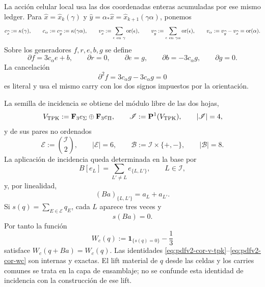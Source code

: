 La acción celular local usa las dos coordenadas enteras acumuladas por ese
mismo ledger. Para
\(\widehat x=\widehat x_k(\gamma)\) y
\(\widehat y=\alpha_*\widehat x=\widehat x_{k+1}(\gamma\alpha)\), ponemos
\begin{equation}
\label{eq:pdfv2-cor-c-v}
 c_{\widehat x}:=\kappa(\gamma),\qquad
 c_\alpha:=c_{\widehat y}:=\kappa(\gamma\alpha),
 \qquad
 v_{\widehat x}:=\sum_{\epsilon\ {\rm en}\ \gamma}
                  \operatorname{or}(\epsilon),\qquad
 v_{\widehat y}:=
 \sum_{\epsilon\ {\rm en}\ \gamma\alpha}
                  \operatorname{or}(\epsilon),\qquad
 v_\alpha:=v_{\widehat y}-v_{\widehat x}
           =\operatorname{or}(\alpha).
\end{equation}
Sobre los generadores \(f,r,e,b,g\) se define
\begin{equation}
\label{eq:pdfv2-cor-complejo-local}
 \partial f=3c_\alpha e+b,\qquad
 \partial r=0,\qquad
 \partial e=g,\qquad
 \partial b=-3c_\alpha g,\qquad
 \partial g=0.
\end{equation}
La cancelación
\begin{equation}
\label{eq:pdfv2-cor-dos-cero}
 \partial^2f=3c_\alpha g-3c_\alpha g=0
\end{equation}
es literal y usa el mismo carry con los dos signos impuestos por la
orientación.

La semilla de incidencia se obtiene del módulo libre de las dos hojas,
\begin{equation}
\label{eq:pdfv2-cor-v-tpk}
 V_{\rm TPK}:=\mathbf F_3e_\Sigma\oplus\mathbf F_3e_\Pi,
 \qquad
 \mathscr I:=\mathbf P^1(V_{\rm TPK}),
 \qquad |\mathscr I|=4,
\end{equation}
y de sus pares no ordenados
\begin{equation}
\label{eq:pdfv2-cor-incidencias}
 \mathscr E:=\binom{\mathscr I}{2},
 \qquad |\mathscr E|=6,
 \qquad
 \mathscr B:=\mathscr I\times\{+,-\},
 \qquad |\mathscr B|=8.
\end{equation}
La aplicación de incidencia queda determinada en la base por
\begin{equation}
\label{eq:pdfv2-cor-b-incidencia-generadores}
 B[e_L]=\sum_{L'\neq L}e_{\{L,L'\}},
 \qquad L\in\mathscr I,
\end{equation}
y, por linealidad,
\begin{equation}
\label{eq:pdfv2-cor-b-incidencia-coordenadas}
 (Ba)_{\{L,L'\}}=a_L+a_{L'}.
\end{equation}
Si \(s(q)=\sum_{E\in\mathscr E}q_E\), cada \(L\) aparece tres veces y
\begin{equation}
\label{eq:pdfv2-cor-sb-cero}
 s(Ba)=0.
\end{equation}
Por tanto la función
\begin{equation}
\label{eq:pdfv2-cor-wc}
 W_c(q):=\mathbf1_{\{s(q)=0\}}-\frac13
\end{equation}
satisface \(W_c(q+Ba)=W_c(q)\). Las identidades
\eqref{eq:pdfv2-cor-v-tpk}--\eqref{eq:pdfv2-cor-wc} son internas y exactas.
El lift material de \(q\) desde las celdas y los carries comunes se trata en
la capa de ensamblaje; no se confunde esta identidad de incidencia con la
construcción de ese lift.

